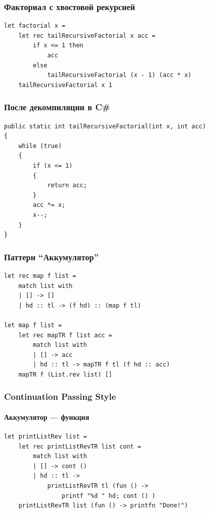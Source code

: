 \documentclass[xetex,mathserif,serif]{beamer}
\begin{document}
	\begin{frame}[fragile]
		\frametitle{Факториал с хвостовой рекурсией}
		\begin{verbatim}
let factorial x =
    let rec tailRecursiveFactorial x acc =
        if x <= 1 then
            acc
        else
            tailRecursiveFactorial (x - 1) (acc * x)
    tailRecursiveFactorial x 1
		\end{verbatim}
\end{frame}
	
	\begin{frame}[fragile]
		\frametitle{После декомпиляции в C\#}
		\begin{verbatim}
public static int tailRecursiveFactorial(int x, int acc)
{
    while (true)
    {
        if (x <= 1)
        {
            return acc;
        }
        acc *= x;
        x--;
    }
}
		\end{verbatim}
\end{frame}

	\begin{frame}[fragile]
		\frametitle{Паттерн ``Аккумулятор''}
		\begin{verbatim}
let rec map f list =
    match list with
    | [] -> []
    | hd :: tl -> (f hd) :: (map f tl)

let map f list =
    let rec mapTR f list acc =
        match list with
        | [] -> acc
        | hd :: tl -> mapTR f tl (f hd :: acc)
    mapTR f (List.rev list) []
		\end{verbatim}
\end{frame}

	\begin{frame}[fragile]
		\frametitle{Continuation Passing Style}
		\framesubtitle{Аккумулятор --- функция}
		\begin{verbatim}
let printListRev list =
    let rec printListRevTR list cont =
        match list with
        | [] -> cont ()
        | hd :: tl ->
            printListRevTR tl (fun () -> 
                printf "%d " hd; cont () )
    printListRevTR list (fun () -> printfn "Done!")
		\end{verbatim}
\end{frame}
\end{document}
